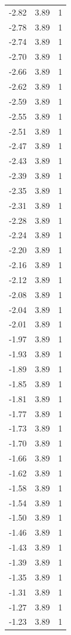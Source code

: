 \begin{longtable}{lrr}
  -2.82 & 3.89 & 1 \\
  -2.78 & 3.89 & 1 \\
  -2.74 & 3.89 & 1 \\
  -2.70 & 3.89 & 1 \\
  -2.66 & 3.89 & 1 \\
  -2.62 & 3.89 & 1 \\
  -2.59 & 3.89 & 1 \\
  -2.55 & 3.89 & 1 \\
  -2.51 & 3.89 & 1 \\
  -2.47 & 3.89 & 1 \\
  -2.43 & 3.89 & 1 \\
  -2.39 & 3.89 & 1 \\
  -2.35 & 3.89 & 1 \\
  -2.31 & 3.89 & 1 \\
  -2.28 & 3.89 & 1 \\
  -2.24 & 3.89 & 1 \\
  -2.20 & 3.89 & 1 \\
  -2.16 & 3.89 & 1 \\
  -2.12 & 3.89 & 1 \\
  -2.08 & 3.89 & 1 \\
  -2.04 & 3.89 & 1 \\
  -2.01 & 3.89 & 1 \\
  -1.97 & 3.89 & 1 \\
  -1.93 & 3.89 & 1 \\
  -1.89 & 3.89 & 1 \\
  -1.85 & 3.89 & 1 \\
  -1.81 & 3.89 & 1 \\
  -1.77 & 3.89 & 1 \\
  -1.73 & 3.89 & 1 \\
  -1.70 & 3.89 & 1 \\
  -1.66 & 3.89 & 1 \\
  -1.62 & 3.89 & 1 \\
  -1.58 & 3.89 & 1 \\
  -1.54 & 3.89 & 1 \\
  -1.50 & 3.89 & 1 \\
  -1.46 & 3.89 & 1 \\
  -1.43 & 3.89 & 1 \\
  -1.39 & 3.89 & 1 \\
  -1.35 & 3.89 & 1 \\
  -1.31 & 3.89 & 1 \\
  -1.27 & 3.89 & 1 \\
  -1.23 & 3.89 & 1 \\

\end{longtable}
